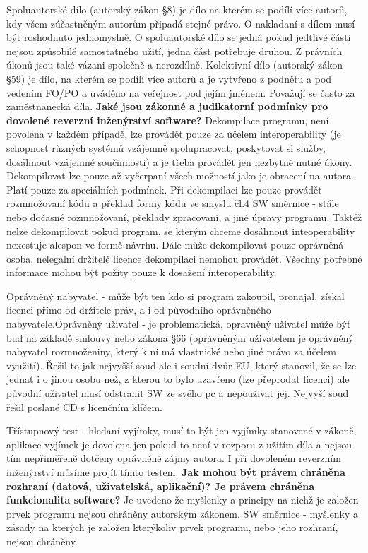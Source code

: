 \documentclass[12pt,a4paper,czech]{report}
\newcommand{\nadpis}[1]{\noindent\textbf{\Large{#1}}\normalsize}
\begin{document}
Spoluautorské dílo (autorský zákon §8) je dílo na kterém se podílí více autorů, kdy všem zúčastněným autorům připadá stejné právo. O nakladaní s dílem musí být roshodnuto jednomyslně. O spoluautorské dílo se jedná pokud jedtlivé části nejsou způsobilé samostatného užití, jedna část potřebuje druhou. Z právních úkonů jsou také vázani společně a nerozdílně.
Kolektivní dílo (autorský zákon §59) je dílo, na kterém se podílí více autorů a je vytvřeno z podnětu a pod vedením FO/PO a uváděno na veřejnost pod jejím jménem. Považují se často za zaměstnanecká díla.
\newline
\newline
\nadpis{Jaké jsou zákonné a judikatorní podmínky pro dovolené reverzní inženýrství software?}
\newline
\newline
Dekompilace programu, není povolena v každém případě, lze provádět pouze za účelem interoperability (je schopnost různých systémů vzájemně spolupracovat, poskytovat si služby, dosáhnout vzájemné součinnosti) a je třeba provádět jen nezbytně nutné úkony. Dekompilovat lze pouze až vyčerpaní všech možností jako je obracení na autora. Platí pouze za speciálních podmínek. Při dekompilaci lze pouze provádět rozmnožovaní kódu a překlad formy kódu ve smyslu čl.4 SW směrnice - stále nebo dočasné rozmnožovaní, překlady zpracovaní, a jiné úpravy programu. Taktéž nelze dekompilovat pokud program, se kterým chceme dosáhnout inteoperability nexestuje alespon ve formě návrhu. Dále může dekompilovat pouze oprávněná osoba, nelegalní držitelé licence dekompilaci nemohou provádět. Všechny potřebné informace mohou být požity pouze k dosažení interoperability. 

Oprávněný nabyvatel - může být ten kdo si program zakoupil, pronajal, získal licenci přímo od držitele práv, a i od původního oprávněného nabyvatele.\newline Oprávněný uživatel - je problematická, opravněný uživatel může být buď na základě smlouvy nebo zákona §66 (oprávněným uživatelem je oprávněný nabyvatel rozmnoženiny, který k ní má vlastnické nebo jiné právo za účelem využití). Řešil to jak nejvyšší soud ale i soudní dvůr EU, který stanovil, že se lze jednat i o jinou osobu než, z kterou to bylo uzavřeno (lze přeprodat licenci) ale původní uživatel musí odstranit SW ze svého pc a nepouživat jej. Nejvyší soud řešil poslané CD s licenčním klíčem.

Třístupnový test - hledaní vyjímky, musí to být jen vyjímky stanovené v zákoně, aplikace vyjímek je dovolena jen pokud to není v rozporu z užitím díla a nejsou tím nepřiměřeně dotčeny oprávněné zájmy autora. I při dovoleném reverzním inženýrství můsíme projít tímto testem.
\newline
\newline
\nadpis{Jak mohou být právem chráněna rozhraní (datová, uživatelská, aplikační)? Je právem chráněna funkcionalita software?}
\newline
\newline
Je uvedeno že myšlenky a principy na nichž je založen prvek programu nejsou chráněny autorským zákonem. SW směrnice - myšlenky a zásady na kterých je založen kterýkoliv prvek programu, nebo jeho rozhraní, nejsou chráněny. 
\end{document}
